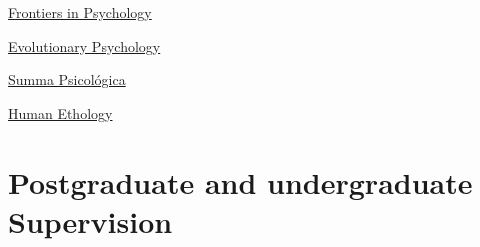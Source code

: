 \documentclass[11pt,a4paper,]{awesome-cv}
\begin{document}
\begin{cventries}
{\begin{cvitems}
\item \href{https://www.frontiersin.org/journals/psychology}{Frontiers in Psychology}
\item \href{https://journals.sagepub.com/home/evp}{Evolutionary Psychology}
\item \href{http://sumapsicologica.konradlorenz.edu.co/}{Summa Psicológica}
\item \href{https://ishe.org/human-ethology/}{Human Ethology}
\end{cvitems}}
\end{cventries}

\hypertarget{postgraduate-and-undergraduate-supervision}{%
\section{Postgraduate and undergraduate
Supervision}\label{postgraduate-and-undergraduate-supervision}}
\end{document}
